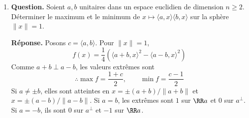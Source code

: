 \documentclass[12pt, a4paper]{article}
\begin{document}
\begin{enumerate}[label=8.\arabic*., start=70]
\begin{minipage}[t]{\linewidth}
\begin{enumerate}[\arabic*.]
\end{enumerate}
\end{minipage}

  \item \begin{minipage}[t]{\linewidth}\raggedright
\textbf{Question.} Soient $a,b$ unitaires dans un espace euclidien de dimension $n\geq2$. Déterminer le maximum et le minimum de $x\mapsto\langle a,x\rangle\langle b,x\rangle$ sur la sphère $\|x\|=1$.
\par\smallskip
\textbf{Réponse.} Posons $c=\langle a,b\rangle$. Pour $\|x\|=1$,
    \[
      f(x)=\frac14\left(\langle a+b,x\rangle^2-\langle a-b,x\rangle^2\right)
    \]
    Comme $a+b\perp a-b$, les valeurs extrêmes sont
    \[
      \therefore\max f=\frac{1+c}{2},\qquad\min f=\frac{c-1}{2}
    \]
    Si $a\neq\pm b$, elles sont atteintes en $x=\pm(a+b)/\|a+b\|$ et $x=\pm(a-b)/\|a-b\|$.
    Si $a=b$, les extrêmes sont $1$ sur $\RR a$ et $0$ sur $a^\perp$.
    Si $a=-b$, ils sont $0$ sur $a^\perp$ et $-1$ sur $\RR a$.
\end{minipage}

\end{enumerate}
\end{document}
